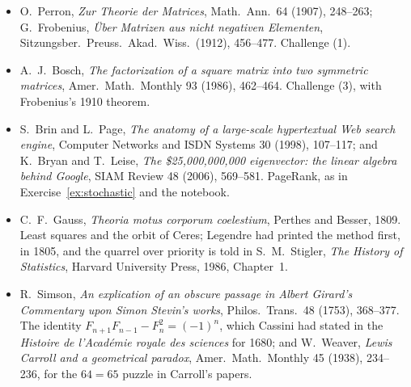 \begin{itemize}
\item O.~Perron, \emph{Zur Theorie der Matrices}, Math.\ Ann.\ 64 (1907), 248--263; G.~Frobenius, \emph{\"Uber Matrizen aus nicht negativen Elementen}, Sitzungsber.\ Preuss.\ Akad.\ Wiss.\ (1912), 456--477. Challenge (1).
\item A.~J.~Bosch, \emph{The factorization of a square matrix into two symmetric matrices}, Amer.\ Math.\ Monthly 93 (1986), 462--464. Challenge (3), with Frobenius's 1910 theorem.
\item S.~Brin and L.~Page, \emph{The anatomy of a large-scale hypertextual Web search engine}, Computer Networks and ISDN Systems 30 (1998), 107--117; and K.~Bryan and T.~Leise, \emph{The \$25{,}000{,}000{,}000 eigenvector: the linear algebra behind Google}, SIAM Review 48 (2006), 569--581. PageRank, as in Exercise~\ref{ex:stochastic} and the notebook.
\item C.~F.~Gauss, \emph{Theoria motus corporum coelestium}, Perthes and Besser, 1809. Least squares and the orbit of Ceres; Legendre had printed the method first, in 1805, and the quarrel over priority is told in S.~M.~Stigler, \emph{The History of Statistics}, Harvard University Press, 1986, Chapter~1.
\item R.~Simson, \emph{An explication of an obscure passage in Albert Girard's Commentary upon Simon Stevin's works}, Philos.\ Trans.\ 48 (1753), 368--377. The identity $F_{n+1}F_{n-1}-F_n^2=(-1)^n$, which Cassini had stated in the \emph{Histoire de l'Acad\'emie royale des sciences} for 1680; and W.~Weaver, \emph{Lewis Carroll and a geometrical paradox}, Amer.\ Math.\ Monthly 45 (1938), 234--236, for the $64=65$ puzzle in Carroll's papers.
\end{itemize}
